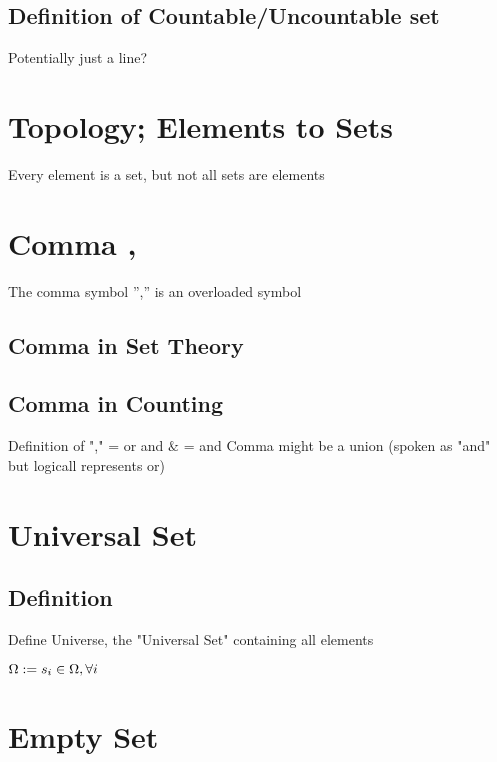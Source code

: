 \documentclass[11pt]{article}
\begin{document}
\subsection{Definition of Countable/Uncountable set}
Potentially just a line?


\section{Topology; Elements to Sets}
Every element is a set, but not all sets are elements

\section{Comma ,}
The comma symbol '','' is an overloaded symbol
\subsection{Comma in Set Theory}
\subsection{Comma in Counting}

Definition of "," = or   and $\&$ = and
Comma might be a union (spoken as "and" but logicall represents or)



\section{Universal Set}

\subsection{Definition}
Define Universe, the "Universal Set" containing all elements
\begin{center}
$
\Omega := s_i \in \Omega, \forall i \hspace{5mm}
$
\end{center}










\section{Empty Set}
\end{document}
